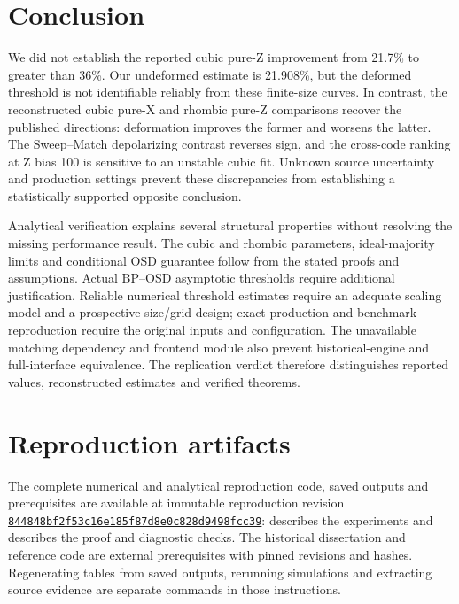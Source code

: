 \section{Conclusion}
We did not establish the reported cubic pure-Z improvement from 21.7\% to greater than 36\%. Our undeformed estimate is 21.908\%, but the deformed threshold is not identifiable reliably from these finite-size curves. In contrast, the reconstructed cubic pure-X and rhombic pure-Z comparisons recover the published directions: deformation improves the former and worsens the latter. The Sweep--Match depolarizing contrast reverses sign, and the cross-code ranking at Z bias 100 is sensitive to an unstable cubic fit. Unknown source uncertainty and production settings prevent these discrepancies from establishing a statistically supported opposite conclusion.

Analytical verification explains several structural properties without resolving the missing performance result. The cubic and rhombic parameters, ideal-majority limits and conditional OSD guarantee follow from the stated proofs and assumptions. Actual BP--OSD asymptotic thresholds require additional justification. Reliable numerical threshold estimates require an adequate scaling model and a prospective size/grid design; exact production and benchmark reproduction require the original inputs and configuration. The unavailable matching dependency and frontend module also prevent historical-engine and full-interface equivalence. The replication verdict therefore distinguishes reported values, reconstructed estimates and verified theorems.



\appendix
\section{Reproduction artifacts}
The complete numerical and analytical reproduction code, saved outputs and prerequisites are available at immutable reproduction revision \href{https://github.com/alectionary/vibe-math/commit/844848bf2f53c16e185f87d8e0c828d9498fcc39}{\nolinkurl{844848bf2f53c16e185f87d8e0c828d9498fcc39}}:  describes the experiments and  describes the proof and diagnostic checks. The historical dissertation and reference code are external prerequisites with pinned revisions and hashes. Regenerating tables from saved outputs, rerunning simulations and extracting source evidence are separate commands in those instructions.

